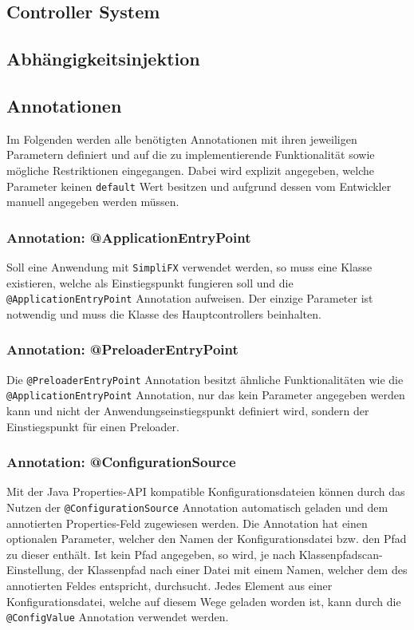 \subsection{Controller System}
\subsection{Abhängigkeitsinjektion}
\subsection{Annotationen}
Im Folgenden werden alle benötigten Annotationen mit ihren jeweiligen Parametern definiert und auf die zu implementierende Funktionalität sowie mögliche Restriktionen eingegangen. Dabei wird explizit angegeben, welche Parameter keinen \texttt{default} Wert besitzen und aufgrund dessen vom Entwickler manuell angegeben werden müssen.
\subsubsection{Annotation: @ApplicationEntryPoint}
Soll eine Anwendung mit \texttt{SimpliFX} verwendet werden, so muss eine Klasse existieren, welche als Einstiegspunkt fungieren soll und die \texttt{@ApplicationEntryPoint} Annotation aufweisen. Der einzige Parameter ist notwendig und muss die Klasse des Hauptcontrollers beinhalten.
\subsubsection{Annotation: @PreloaderEntryPoint}
Die \texttt{@PreloaderEntryPoint} Annotation besitzt ähnliche Funktionalitäten wie die \texttt{@ApplicationEntryPoint} Annotation, nur das kein Parameter angegeben werden kann und nicht der Anwendungseinstiegspunkt definiert wird, sondern der Einstiegspunkt für einen Preloader. 
\subsubsection{Annotation: @ConfigurationSource}
Mit der Java Properties-API kompatible Konfigurationsdateien können durch das Nutzen der \texttt{@ConfigurationSource} Annotation automatisch geladen und dem annotierten Properties-Feld zugewiesen werden. Die Annotation hat einen optionalen Parameter, welcher den Namen der Konfigurationsdatei bzw. den Pfad zu dieser enthält. Ist kein Pfad angegeben, so wird, je nach Klassenpfadscan-Einstellung, der Klassenpfad nach einer Datei mit einem Namen, welcher dem des annotierten Feldes entspricht, durchsucht. Jedes Element aus einer Konfigurationsdatei, welche auf diesem Wege geladen worden ist, kann durch die \texttt{@ConfigValue} Annotation verwendet werden.
